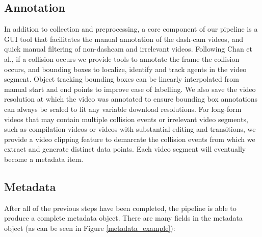 \documentclass[letterpaper, 10 pt, conference]{IEEEconf}
\begin{document}
\subsection{Annotation}

In addition to collection and preprocessing, a core component of our pipeline is a GUI tool that facilitates the manual annotation of the dash-cam videos, and quick manual filtering of non-dashcam and irrelevant videos. Following Chan et al.\cite{chan2016anticipating}, if a collision occurs we provide tools to annotate the frame the collision occurs, and bounding boxes to localize, identify and track agents in the video segment. Object tracking bounding boxes can be linearly interpolated from manual start and end points to improve ease of labelling. We also save the video resolution at which the video was annotated to ensure bounding box annotations can always be scaled to fit any variable download resolutions. For long-form videos that may contain multiple collision events or irrelevant video segments, such as compilation videos or videos with substantial editing and transitions, we provide a video clipping feature to demarcate the collision events from which we extract and generate distinct data points. 
Each video segment will eventually become a metadata item. 

\subsection{Metadata}
After all of the previous steps have been completed, the pipeline is able to produce a complete metadata object.
There are many fields in the metadata object (as can be seen in Figure \ref{metadata_example}):
\end{document}
